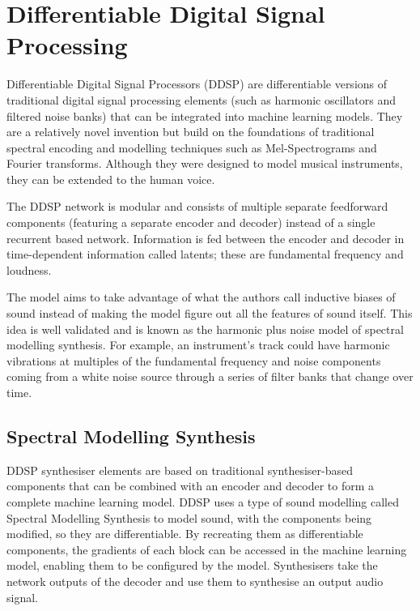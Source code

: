 \section{Differentiable Digital Signal Processing}
\label{section:DDSP}

Differentiable Digital Signal Processors (DDSP) are differentiable versions of traditional digital signal processing elements (such as harmonic oscillators and filtered noise banks) that can be integrated into machine learning models\cite{OriginalDDSP}. They are a relatively novel invention but build on the foundations of traditional spectral encoding and modelling techniques such as Mel-Spectrograms and Fourier transforms. Although they were designed to model musical instruments, they can be extended to the human voice.

The DDSP network is modular and consists of multiple separate feedforward components (featuring a separate encoder and decoder) instead of a single recurrent based network. Information is fed between the encoder and decoder in time-dependent information called latents; these are fundamental frequency and loudness.

The model aims to take advantage of what the authors call inductive biases of sound instead of making the model figure out all the features of sound itself. This idea is well validated and is known as the harmonic plus noise model of spectral modelling synthesis\cite{HarmonicPlusNoise}. For example, an instrument's track could have harmonic vibrations at multiples of the fundamental frequency and noise components coming from a white noise source through a series of filter banks that change over time.

\subsection{Spectral Modelling Synthesis}

DDSP synthesiser elements are based on traditional synthesiser-based components that can be combined with an encoder and decoder to form a complete machine learning model. DDSP uses a type of sound modelling called Spectral Modelling Synthesis\cite{SpectralModellingSynthesis} to model sound, with the components being modified, so they are differentiable. By recreating them as differentiable components, the gradients of each block can be accessed in the machine learning model, enabling them to be configured by the model. Synthesisers take the network outputs of the decoder and use them to synthesise an output audio signal.

